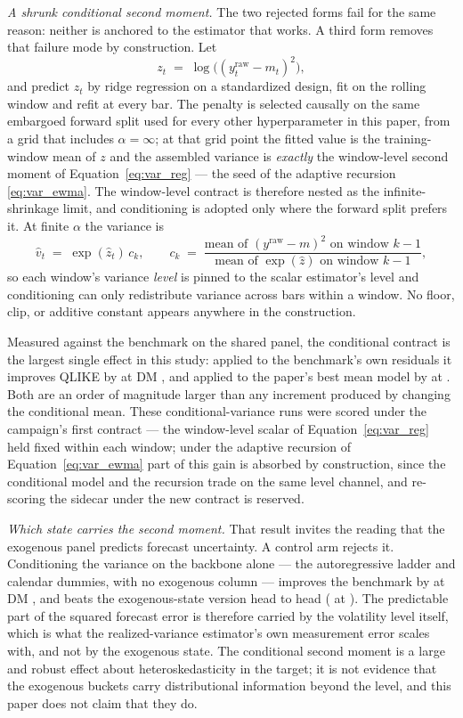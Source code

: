 \emph{A shrunk conditional second moment.} The two rejected forms fail
for the same reason: neither is anchored to the estimator that works.
A third form removes that failure mode by construction. Let
\[
z_t \;=\; \log\bigl( (y^{\mathrm{raw}}_t - m_t)^2 \bigr),
\]
and predict $z_t$ by ridge regression on a standardized design, fit on
the rolling window and refit at every bar. The penalty is selected
causally on the same embargoed forward split used for every other
hyperparameter in this paper, from a grid that includes
$\alpha = \infty$; at that grid point the fitted value is the
training-window mean of $z$ and the assembled variance is
\emph{exactly} the window-level second moment of
Equation~\eqref{eq:var_reg} --- the seed of the adaptive recursion
\eqref{eq:var_ewma}. The window-level contract is therefore nested as
the infinite-shrinkage limit, and conditioning is adopted only where the
forward split prefers it. At finite $\alpha$ the variance is
\[
\hat{v}_t \;=\; \exp(\hat{z}_t)\, c_k,
\qquad
c_k \;=\;
\frac{\text{mean of } (y^{\mathrm{raw}} - m)^2 \text{ on window } k-1}
     {\text{mean of } \exp(\hat{z}) \text{ on window } k-1},
\]
so each window's variance \emph{level} is pinned to the scalar
estimator's level and conditioning can only redistribute variance across
bars within a window. No floor, clip, or additive constant appears
anywhere in the construction.

Measured against the benchmark on the shared panel, the conditional
contract is the largest single effect in this study: applied to the
benchmark's own residuals it improves QLIKE by
\unifIncrCondVarBenchDQ{} at DM \unifIncrCondVarBenchDM{}, and applied
to the paper's best mean model by \unifIncrCondVarChampDQ{} at
\unifIncrCondVarChampDM{}. Both are an order of magnitude larger than
any increment produced by changing the conditional mean. These
conditional-variance runs were scored under the campaign's first
contract --- the window-level scalar of Equation~\eqref{eq:var_reg}
held fixed within each window; under the adaptive recursion of
Equation~\eqref{eq:var_ewma} part of this gain is absorbed by
construction, since the conditional model and the recursion trade on
the same level channel, and re-scoring the sidecar under the new
contract is reserved.

\emph{Which state carries the second moment.} That result invites the
reading that the exogenous panel predicts forecast uncertainty. A
control arm rejects it. Conditioning the variance on the backbone alone
--- the autoregressive ladder and calendar dummies, with no exogenous
column --- improves the benchmark by \unifIncrCondVarBenchLevelDQ{} at
DM \unifIncrCondVarBenchLevelDM{}, and beats the exogenous-state
version head to head
(\unifIncrCondVarBenchLevelVsCondVarBenchDQ{} at
\unifIncrCondVarBenchLevelVsCondVarBenchDM{}). The predictable part of
the squared forecast error is therefore carried by the volatility level
itself, which is what the realized-variance estimator's own measurement
error scales with, and not by the exogenous state. The conditional
second moment is a large and robust effect about heteroskedasticity in
the target; it is not evidence that the exogenous buckets carry
distributional information beyond the level, and this paper does not
claim that they do.

